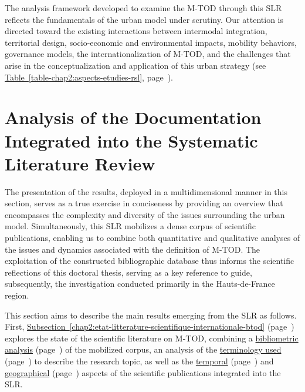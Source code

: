\begin{refsegment}
The analysis framework developed to examine the \acrshort{M-TOD} through this \acrshort{SLR} reflects the fundamentals of the urban model under scrutiny. Our attention is directed toward the existing interactions between intermodal integration, territorial design, socio-economic and environmental impacts, mobility behaviors, governance models, the internationalization of \acrshort{M-TOD}, and the challenges that arise in the conceptualization and application of this urban strategy (see \hyperref[table-chap2:aspects-etudies-rsl]{Table~\ref{table-chap2:aspects-etudies-rsl}}, page~\pageref{table-chap2:aspects-etudies-rsl}).%

    \newpage
\section{Analysis of the Documentation Integrated into the Systematic Literature Review
    \label{chap2:analyse-documentation-rsl}
    }

The presentation of the results, deployed in a multidimensional manner in this section, serves as a true exercise in conciseness by providing an overview that encompasses the complexity and diversity of the issues surrounding the urban model. Simultaneously, this \acrshort{SLR} mobilizes a dense corpus of scientific publications, enabling us to combine both quantitative and qualitative analyses of the issues and dynamics associated with the definition of \acrshort{M-TOD}. The exploitation of the constructed bibliographic database thus informs the scientific reflections of this doctoral thesis, serving as a key reference to guide, subsequently, the investigation conducted primarily in the Hauts-de-France region.%

This section aims to describe the main results emerging from the \acrshort{SLR} as follows. First, \hyperref[chap2:etat-litterature-scientifique-internationale-btod]{Subsection~\ref{chap2:etat-litterature-scientifique-internationale-btod}} (page~\pageref{chap2:etat-litterature-scientifique-internationale-btod}) explores the state of the scientific literature on \acrshort{M-TOD}, combining a \hyperref[chap2:analyse-bibliometrique]{bibliometric analysis} (page~\pageref{chap2:analyse-bibliometrique}) of the mobilized corpus, an analysis of the \hyperref[chap2:analyse-textuelle]{terminology used} (page~\pageref{chap2:analyse-textuelle}) to describe the research topic, as well as the \hyperref[chap2:evolution-recherches-tc-mobilite-individuelle-legere]{temporal} (page~\pageref{chap2:evolution-recherches-tc-mobilite-individuelle-legere}) and \hyperref[chap2:exploration-terrains-geographiques]{geographical} (page~\pageref{chap2:exploration-terrains-geographiques}) aspects of the scientific publications integrated into the \acrshort{SLR}.%


\end{refsegment}
